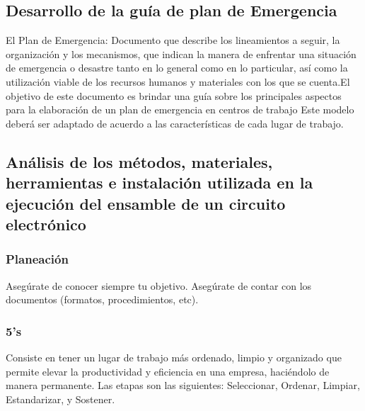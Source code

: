     \subsection{Desarrollo de la guía de plan de Emergencia}
    
    El Plan de Emergencia: Documento que describe los lineamientos a seguir, la organización y los mecanismos, que indican la manera de enfrentar una situación de emergencia o desastre tanto en lo general como en lo particular, así como la utilización viable de los recursos humanos y materiales con los que se cuenta.El objetivo de este documento es brindar una guía sobre los principales aspectos para la elaboración de un plan de emergencia en centros de trabajo Este modelo deberá ser adaptado de acuerdo a las características de cada lugar de trabajo.\cite{romero1993guia}
    \subsection{Análisis de los métodos, materiales, herramientas e instalación utilizada en la ejecución del ensamble de un circuito electrónico}
    
    \subsubsection{Planeación}
    
    Asegúrate de conocer siempre tu objetivo.
    Asegúrate de contar con los documentos (formatos, procedimientos, etc).
    \subsubsection{5's}
    
    Consiste en tener un lugar de trabajo
    más ordenado, limpio y organizado que
    permite elevar la productividad y
    eficiencia en una empresa, haciéndolo de manera permanente.
    Las etapas son las siguientes: Seleccionar, Ordenar, Limpiar, Estandarizar, y Sostener.
